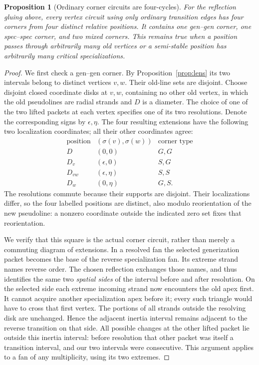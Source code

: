 \documentclass[11pt]{article}
\newtheorem{proposition}[theorem]{Proposition}
\theoremstyle{definition}\newtheorem{definition}[theorem]{Definition}
\begin{document}
\begin{proposition}[Ordinary corner circuits are four-cycles]\label{prop:ordinary-links}
For the reflection gluing above, every vertex circuit using only
ordinary transition edges has four corners from four distinct relative
positions. It contains one gen--gen corner, one spec--spec corner, and
two mixed corners. This remains true when a position passes through
arbitrarily many old vertices or a semi-stable position has arbitrarily
many critical specializations.
\end{proposition}
\begin{proof}
We first check a gen--gen corner. By Proposition~\ref{prop:lens} its two intervals belong to
distinct vertices $v,w$. Their old-line sets are disjoint. Choose
disjoint closed coordinate disks at $v,w$, containing no other old
vertex, in which the old pseudolines are radial strands and $D$ is a
diameter. The choice of one of the two lifted packets at each vertex
specifies one of its two resolutions. Denote the corresponding signs
by $\epsilon,\eta$. The four resulting extensions have the following
two localization coordinates; all their other coordinates agree:
\[
\begin{array}{c|c|c}
\text{position}&(\sigma(v),\sigma(w))&\text{corner type}\\\hline
D&(0,0)&G,G\\
D_v&(\epsilon,0)&S,G\\
D_{vw}&(\epsilon,\eta)&S,S\\
D_w&(0,\eta)&G,S.
\end{array}
\]
The resolutions commute because their supports are disjoint. Their
localizations differ, so the four labelled positions are distinct,
also modulo reorientation of the new pseudoline: a nonzero coordinate
outside the indicated zero set fixes that reorientation.

We verify that this square is the actual corner circuit, rather than
merely a commuting diagram of extensions. In a resolved fan the selected
generization packet becomes the base of the reverse specialization
fan. Its extreme strand names reverse order. The chosen reflection
exchanges those names, and thus identifies the same two \emph{spatial
sides} of the interval before and after resolution. On the selected
side each extreme incoming strand now encounters the old apex first.
It cannot acquire another specialization apex before it; every such
triangle would have to cross that first vertex. The portions of all
strands outside the resolving disk are unchanged. Hence the adjacent
inertia interval remains adjacent to the reverse transition on that
side. All possible changes at the other lifted packet lie outside
this inertia interval: before resolution that other packet was itself
a transition interval, and our two intervals were consecutive. This
argument applies to a fan of any multiplicity, using its two extremes.


\end{proof}
\end{document}
